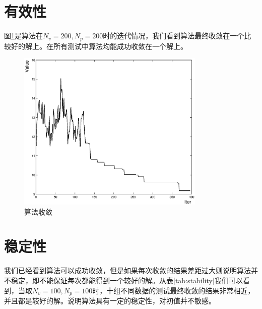 \section{有效性}
图\ref{fig:feas}是算法在$N_v = 200,N_p = 200$时的迭代情况，我们看到算法最终收敛在一个比较好的解上。在所有测试中算法均能成功收敛在一个解上。
\begin{figure}[htbp]
\centering %
\includegraphics[width=0.8\textwidth]{figures/feasibility.eps}
\caption{算法收敛} \label{fig:feas}
\end{figure}
\section{稳定性}
我们已经看到算法可以成功收敛，但是如果每次收敛的结果差距过大则说明算法并不稳定，即不能保证每次都能得到一个较好的解。从表\ref{tab:stability}我们可以看到，当取$N_v = 100, N_p = 100$时，十组不同数据的测试最终收敛的结果非常相近，并且都是较好的解。说明算法具有一定的稳定性，对初值并不敏感。

